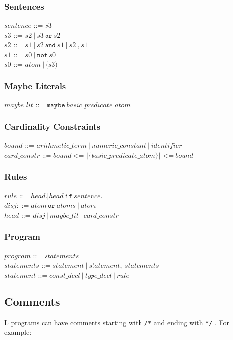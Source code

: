 \documentclass[a4paper,10pt]{article}
\begin{document}
\subsubsection{Sentences}

$sentence$ ::= $s3$ \\
$s3$ ::= $s2~|~s3~\texttt{or}~s2$\\
$s2$ ::= $s1~|~s2~\texttt{and}~s1~|~s2~\texttt{,}~s1$
\\
$s1$ ::= $s0~|~\texttt{not}~s0$\\ 
$s0$ ::= $atom~|~\texttt{(}s3\texttt{)}$ 
\subsubsection{Maybe Literals}
$maybe\_lit$ ::= $\texttt{maybe}~basic\_predicate\_atom$\\
\subsubsection{Cardinality Constraints}
$bound$ ::= $arithmetic\_term~|~numeric\_constant~|~identifier$\\
$card\_constr$ ::= $bound~ \texttt{<= |\{}  basic\_predicate\_atom \texttt{\}| <=} ~bound$\\

\subsubsection{Rules}
$rule$ ::= $head \texttt{.} | head~\texttt{if}~sentence \texttt{.} $ \\
$disj ::= atom~\texttt{or}~atoms~|~atom$\\
$head$ ::= $disj~|~maybe\_lit~|~card\_constr$
 
\subsubsection{Program}
$program$ ::= $statements$\\
$statements$ ::= $statement~|~statement,~statements$\\
$statement$ ::= $ const\_decl~|~type\_decl~|~rule$ 


\subsection{Comments}

L programs can have comments starting with \texttt{/*} and ending with \texttt{*/} . For example:
\end{document}
